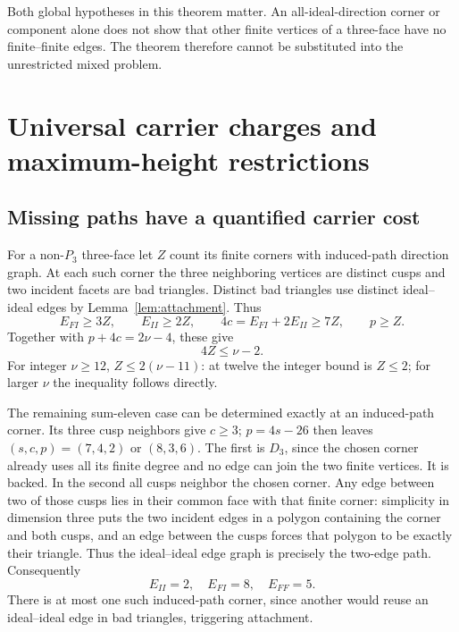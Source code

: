 \documentclass[11pt]{article}
\theoremstyle{definition}\newtheorem{definition}[theorem]{Definition}
\theoremstyle{remark}\newtheorem{remark}[theorem]{Remark}
\newcommand{\nuu}{\nu}
\newcommand{\Pthree}{P_3}
\newcommand{\Dthree}{D_3}
\begin{document}
Both global hypotheses in this theorem matter. An all-ideal-direction
corner or component alone does not show that other finite vertices
of a three-face have no finite--finite edges. The theorem therefore
cannot be substituted into the unrestricted mixed problem.

\section{Universal carrier charges and maximum-height restrictions}
\subsection{Missing paths have a quantified carrier cost}
For a non-\(\Pthree\) three-face let \(Z\) count its finite
corners with induced-path direction graph. At each such corner the
three neighboring vertices are distinct cusps and two incident facets
are bad triangles. Distinct bad triangles use distinct ideal--ideal
edges by Lemma~\ref{lem:attachment}. Thus
\[
 E_{FI}\ge3Z,\qquad E_{II}\ge2Z,\qquad
 4c=E_{FI}+2E_{II}\ge7Z,\qquad p\ge Z.
\]
Together with \(p+4c=2\nuu-4\), these give
\begin{equation}\label{eq:Z}
 4Z\le\nuu-2.
\end{equation}
For integer \(\nuu\ge12\), \(Z\le2(\nuu-11)\):
at twelve the integer bound is \(Z\le2\); for larger \(\nuu\)
the inequality follows directly.

The remaining sum-eleven case can be determined exactly at an
induced-path corner. Its three cusp neighbors give \(c\ge3\);
\(p=4s-26\) then leaves \((s,c,p)=(7,4,2)\) or \((8,3,6)\).
The first is \(\Dthree\), since the chosen corner already uses
all its finite degree and no edge can join the two finite vertices.
It is backed. In the second all cusps neighbor the chosen corner.
Any edge between two of those cusps lies in their common face with
that finite corner: simplicity in dimension three puts the two
incident edges in a polygon containing the corner and both cusps,
and an edge between the cusps forces that polygon to be exactly
their triangle. Thus the ideal--ideal edge graph is precisely the
two-edge path. Consequently
\[
 E_{II}=2,\quad E_{FI}=8,\quad E_{FF}=5.
\]
There is at most one such induced-path corner, since another would
reuse an ideal--ideal edge in bad triangles, triggering attachment.
\end{document}
